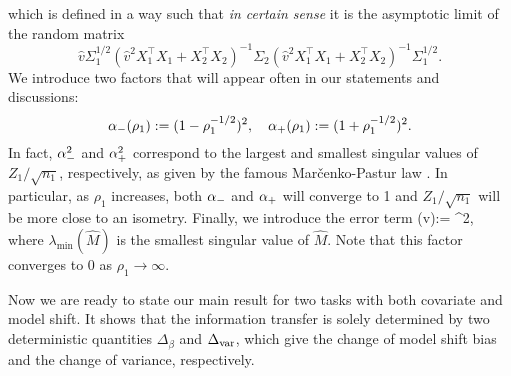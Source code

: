 which is defined in a way such that {\it in certain sense} it is the asymptotic limit of the random matrix 
$$\hat v\Sigma_1^{1/2} (\hat{v}^2 X_1^{\top}X_1 + X_2^{\top}X_2)^{-1} \Sigma_2 (\hat{v}^2 X_1^{\top}X_1 + X_2^{\top}X_2)^{-1}\Sigma_1^{1/2}.$$ 
We introduce two factors that will appear often in our statements and discussions:
$$\alpha_-(\rho_1):=(1- \rho_1^{-1/2})^2,\quad \alpha_+(\rho_1):=(1 + \rho_1^{-1/2})^2.$$ 
In fact, $\alpha_-^2$ and $\alpha_+^2$ correspond to the largest and smallest singular values of $Z_1/\sqrt{n_1}$, respectively, as given by the famous Mar{\v c}enko-Pastur law \cite{MP}. In particular, as $\rho_1$ increases, both $\alpha_-$ and $\alpha_+$ will converge to 1 and $Z_1/\sqrt{n_1}$ will be more close to an isometry. Finally, we introduce the error term  
\be\label{eq_deltaextra}\delta\equiv \delta(\hat v):= \cdot  {}^2,\ee
where $\lambda_{\min}(\hat M)$ is the smallest singular value of $\hat M$. Note that this factor converges to 0 as $\rho_1\to \infty$.


Now we are ready to state our main result for two tasks with both covariate and model shift. It shows that the information transfer is solely determined by two deterministic quantities $\Delta_{\beta}$ and $\Delta_{\text{var}}$, which give the change of model shift bias and the change of variance, respectively.



